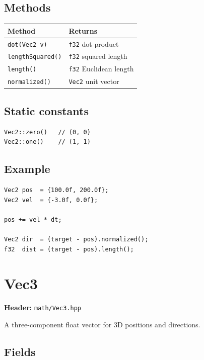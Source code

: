 \subsection{Methods}

\begin{longtable}{ll}
\toprule
\textbf{Method} & \textbf{Returns} \\
\midrule
\texttt{dot(Vec2 v)}       & \texttt{f32} dot product \\
\texttt{lengthSquared()}   & \texttt{f32} squared length \\
\texttt{length()}          & \texttt{f32} Euclidean length \\
\texttt{normalized()}      & \texttt{Vec2} unit vector \\
\bottomrule
\end{longtable}

\subsection{Static constants}

\begin{lstlisting}
Vec2::zero()   // (0, 0)
Vec2::one()    // (1, 1)
\end{lstlisting}

\subsection{Example}

\begin{lstlisting}
Vec2 pos  = {100.0f, 200.0f};
Vec2 vel  = {-3.0f, 0.0f};

pos += vel * dt;

Vec2 dir  = (target - pos).normalized();
f32  dist = (target - pos).length();
\end{lstlisting}

\section{Vec3}
\label{sec:vec3}

\textbf{Header:} \texttt{math/Vec3.hpp}

A three-component float vector for 3D positions and directions.

\subsection{Fields}

